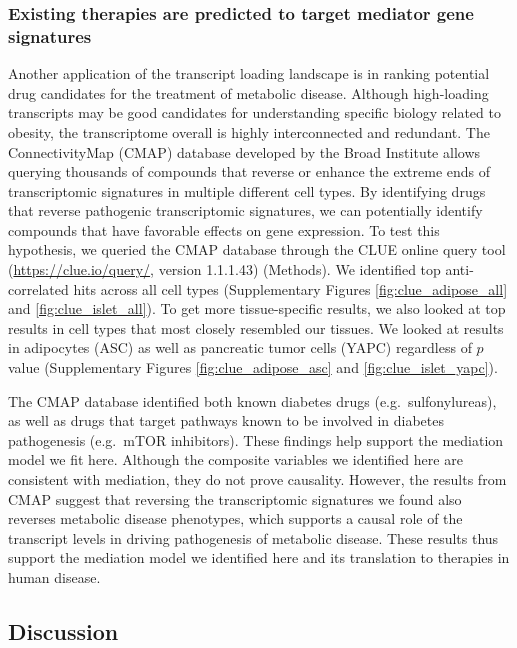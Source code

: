 \documentclass[
]{article}
\begin{document}
\subsubsection{Existing therapies are predicted to target mediator gene
signatures}\label{existing-therapies-are-predicted-to-target-mediator-gene-signatures}

Another application of the transcript loading landscape is in ranking
potential drug candidates for the treatment of metabolic disease.
Although high-loading transcripts may be good candidates for
understanding specific biology related to obesity, the transcriptome
overall is highly interconnected and redundant. The ConnectivityMap
(CMAP) database \cite{pmid17008526, 
pmid29195078} developed by the Broad Institute allows querying thousands
of compounds that reverse or enhance the extreme ends of transcriptomic
signatures in multiple different cell types. By identifying drugs that
reverse pathogenic transcriptomic signatures, we can potentially
identify compounds that have favorable effects on gene expression. To
test this hypothesis, we queried the CMAP database through the CLUE
online query tool (\url{https://clue.io/query/}, version 1.1.1.43)
(Methods). We identified top anti-correlated hits across all cell types
(Supplementary Figures \ref{fig:clue_adipose_all} and
\ref{fig:clue_islet_all}). To get more tissue-specific results, we also
looked at top results in cell types that most closely resembled our
tissues. We looked at results in adipocytes (ASC) as well as pancreatic
tumor cells (YAPC) regardless of \(p\) value (Supplementary Figures
\ref{fig:clue_adipose_asc} and \ref{fig:clue_islet_yapc}).

The CMAP database identified both known diabetes drugs
(e.g.~sulfonylureas), as well as drugs that target pathways known to be
involved in diabetes pathogenesis (e.g.~mTOR inhibitors). These findings
help support the mediation model we fit here. Although the composite
variables we identified here are consistent with mediation, they do not
prove causality. However, the results from CMAP suggest that reversing
the transcriptomic signatures we found also reverses metabolic disease
phenotypes, which supports a causal role of the transcript levels in
driving pathogenesis of metabolic disease. These results thus support
the mediation model we identified here and its translation to therapies
in human disease.

\subsection{Discussion}\label{discussion}
\end{document}
